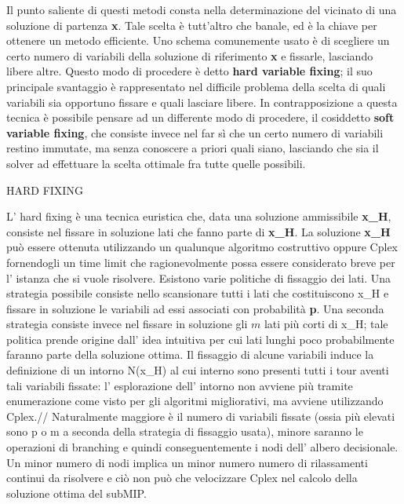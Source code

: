 \documentclass[11pt]{article}
\begin{document}
Il punto saliente di questi metodi consta nella determinazione del vicinato di una soluzione di partenza \textbf{x}. Tale scelta è tutt'altro che banale, ed è la chiave per ottenere un metodo efficiente. Uno schema comunemente usato è di scegliere un certo numero di variabili della soluzione di riferimento \textbf{x} e fissarle, lasciando libere altre. Questo modo di procedere è detto\textbf{ hard variable fixing}; il suo principale svantaggio è rappresentato nel difficile problema della scelta di quali variabili sia opportuno fissare e quali lasciare libere. In contrapposizione a questa tecnica è possibile pensare ad un differente modo di procedere, il cosiddetto \textbf{soft variable fixing}, che consiste invece nel far sì che un certo numero di variabili restino immutate, ma senza conoscere a priori quali siano, lasciando che sia il solver ad effettuare la scelta ottimale fra tutte quelle possibili.


\vspace{2\baselineskip}
HARD FIXING
\vspace{2\baselineskip} 

L' hard fixing è una tecnica euristica che, data una soluzione ammissibile \textbf{x_H}, consiste nel fissare in soluzione lati che fanno parte di \textbf{x_H}. La soluzione \textbf{x_H} può essere ottenuta utilizzando un qualunque algoritmo costruttivo oppure Cplex fornendogli un time limit che ragionevolmente possa essere considerato breve per l' istanza che si vuole risolvere. Esistono varie politiche di fissaggio dei lati. Una strategia possibile consiste nello scansionare tutti i lati che costituiscono x_H e fissare in soluzione le variabili ad essi associati con probabilità \textbf{p}. Una seconda strategia consiste invece nel fissare in soluzione gli $m$ lati più corti di x_H; tale politica prende origine dall' idea intuitiva per cui lati lunghi poco probabilmente faranno parte della soluzione ottima. 
Il fissaggio di alcune variabili induce la definizione di un intorno N(x_H) al cui interno sono presenti tutti i tour aventi tali variabili fissate: l' esplorazione dell' intorno non avviene più tramite enumerazione come visto per gli algoritmi migliorativi, ma avviene utilizzando Cplex.//
Naturalmente maggiore è il numero di variabili fissate (ossia più elevati sono p o m a seconda della strategia di fissaggio usata), minore saranno le operazioni di branching e quindi conseguentemente i nodi dell' albero decisionale. Un minor numero di nodi implica un minor numero numero di rilassamenti continui da risolvere e ciò non può che velocizzare Cplex nel calcolo della soluzione ottima del subMIP.
 
\end{document}
